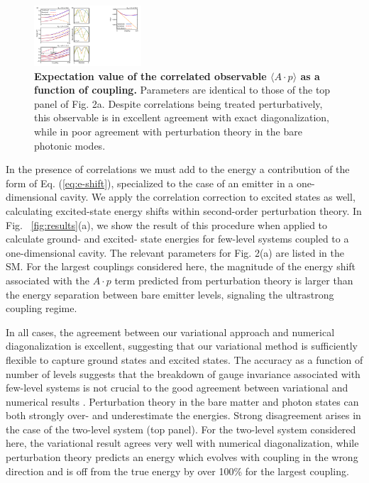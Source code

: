 \documentclass[aps,prl,twocolumn,
	groupedaddress,superscriptaddress,
	amsfonts,amssymb,amsmath,floatfix,
	citeautoscript]{revtex4-1}
\begin{document}
\begin{figure}[t]
\includegraphics[width=4cm]{figure3revision.pdf}
\caption{\textbf{Expectation value of the correlated observable $\langle A\cdot p \rangle $ as a function of coupling.} Parameters are identical to those of the top panel of Fig. 2a. Despite correlations being treated perturbatively, this observable is in excellent agreement with exact diagonalization, while in poor agreement with perturbation theory in the bare photonic modes.}
\label{fig:correlated}
\end{figure}
In the presence of correlations  we must add to the energy a contribution of the form of Eq. (\ref{eq:e-shift}), specialized to the case of an emitter in a one-dimensional cavity. We apply the correlation correction to excited states as well, calculating excited-state energy shifts within second-order perturbation theory. In Fig. ~\ref{fig:results}(a), we show the result of this procedure when applied to calculate ground- and excited- state energies for few-level systems coupled to a one-dimensional cavity. The relevant parameters for Fig. 2(a) are listed in the SM. For the largest couplings considered here, the magnitude of the energy shift associated with the $A \cdot p$ term predicted from perturbation theory is larger than the energy separation between bare emitter levels, signaling the ultrastrong coupling regime.

In all cases, the agreement between our variational approach and numerical diagonalization is excellent, suggesting that our variational method is sufficiently flexible to capture ground states and excited states. The accuracy as a function of number of levels suggests that the breakdown of gauge invariance associated with few-level systems is not crucial to the good agreement between variational and numerical results \cite{bernardis2018breakdown}.  Perturbation theory in the bare matter and photon states can both strongly over- and underestimate the energies. Strong disagreement arises in the case of the two-level system (top panel). For the two-level system considered here, the variational result agrees very well with numerical diagonalization, while perturbation theory predicts an energy which evolves with coupling in the wrong direction and is off from the true energy by over 100\% for the largest coupling.
\end{document}
